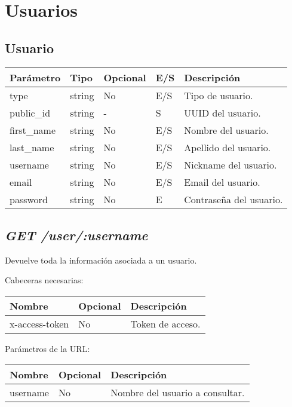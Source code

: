 \section{Usuarios}

\subsection{Usuario}
\begin{table}[h!]
	\centering
	\begin{adjustbox}{max width=\textwidth}
	\begin{tabular}{|l|l|l|l|l|}
		\hline
		Parámetro & Tipo & Opcional & E/S & Descripción \\ \hline
		type & string & No & E/S & Tipo de usuario. \\ \hline
		public\_id & string & - & S & UUID del usuario. \\ \hline
		first\_name & string & No & E/S & Nombre del usuario. \\ \hline
		last\_name & string & No & E/S & Apellido del usuario. \\ \hline
		username & string & No & E/S & Nickname del usuario. \\ \hline
		email & string & No & E/S & Email del usuario. \\ \hline
		password & string & No & E & Contraseña del usuario. \\ \hline
	\end{tabular}
\end{adjustbox}
\end{table}

\subsection{\textit{GET /user/:username}}
Devuelve toda la información asociada a un usuario.

Cabeceras necesarias:
\begin{table}[h!]
	\centering
	\begin{adjustbox}{max width=\textwidth}
	\begin{tabular}{|l|l|l|}
		\hline
		Nombre & Opcional & Descripción \\ \hline
		x-access-token & No & Token de acceso. \\ \hline
	\end{tabular}
\end{adjustbox}
\end{table}

Parámetros de la URL:
\begin{table}[h!]
	\centering
	\begin{adjustbox}{max width=\textwidth}
	\begin{tabular}{|l|l|l|}
		\hline
		Nombre & Opcional & Descripción \\ \hline
		username & No & Nombre del usuario a consultar. \\ \hline
	\end{tabular}
\end{adjustbox}
\end{table}

